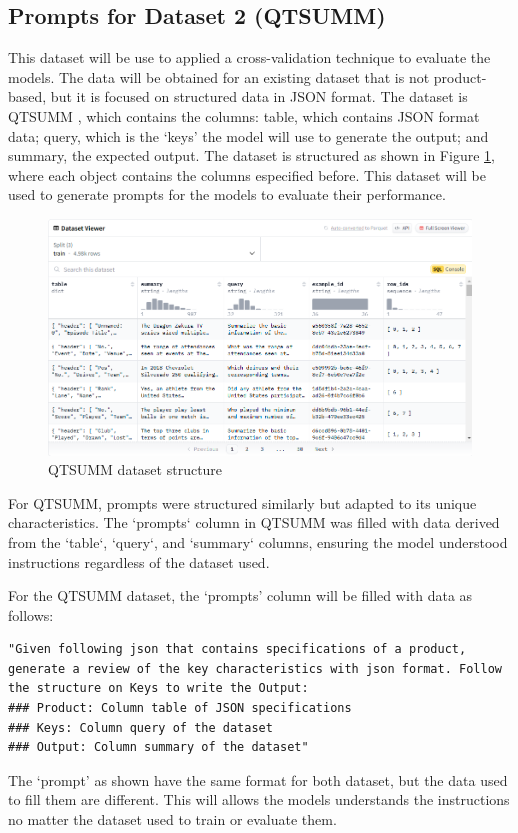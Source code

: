 \subsection{Prompts for Dataset 2 (QTSUMM)}
This dataset will be use to applied a cross-validation technique to evaluate the models. The data will be obtained for an existing dataset that is not product-based, but it is focused on structured data in JSON format. The dataset is QTSUMM \citep{zhao2023qtsummqueryfocusedsummarizationtabular}, which contains the columns: table, which contains JSON format data; query, which is the `keys' the model will use to generate the output; and summary, the expected output. The dataset is structured as shown in Figure \ref{fig:qsumm-structure}, where each object contains the columns especified before. This dataset will be used to generate prompts for the models to evaluate their performance.

\begin{figure}[H]
    \centering
    \includegraphics[width=12cm]{images/qsumm_structure.png} 
    \caption{QTSUMM dataset structure \citep{zhao2023qtsummqueryfocusedsummarizationtabular}}
    \label{fig:qsumm-structure}
\end{figure}

For QTSUMM, prompts were structured similarly but adapted to its unique characteristics. The `prompts` column in QTSUMM was filled with data derived from the `table`, `query`, and `summary` columns, ensuring the model understood instructions regardless of the dataset used.

For the QTSUMM dataset, the `prompts' column will be filled with data as follows:
\newpage
\begin{lstlisting}[style=textstyle, frame = single, caption=Prompt structuration, label=code:prompt-structuration]
"Given following json that contains specifications of a product, generate a review of the key characteristics with json format. Follow the structure on Keys to write the Output: 
### Product: Column table of JSON specifications
### Keys: Column query of the dataset
### Output: Column summary of the dataset"
\end{lstlisting}
The `prompt' as shown have the same format for both dataset, but the data used to fill them are different. This will allows the models understands the instructions no matter the dataset used to train or evaluate them.

